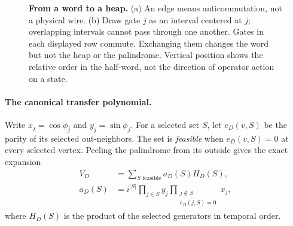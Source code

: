 \documentclass[10pt,letterpaper]{article}
\begin{document}
\begin{figure}[t]
\centering
{}
\caption{\textbf{From a word to a heap.} (a) An edge means anticommutation, not a physical wire. (b) Draw gate $j$ as an interval centered at $j$; overlapping intervals cannot pass through one another. Gates in each displayed row commute. Exchanging them changes the word but not the heap or the palindrome. Vertical position shows the relative order in the half-word, not the direction of operator action on a state.}
\label{L:heapfig}
\end{figure}

\paragraph{The canonical transfer polynomial.}
Write $x_j=\cos\phi_j$ and $y_j=\sin\phi_j$. For a selected set $S$, let $e_D(v,S)$ be the parity of its selected out-neighbors. The set is \emph{feasible} when $e_D(v,S)=0$ at every selected vertex. Peeling the palindrome from its outside gives the exact expansion
\begin{align}
 V_D&=\sum_{S\text{ feasible}}a_D(S)H_D(S),\label{L:expansion}\\
 a_D(S)&=i^{|S|}\prod_{j\in S}y_j
       \prod_{\substack{j\notin S\\e_D(j,S)=0}}x_j,\label{L:amplitude}
\end{align}
where $H_D(S)$ is the product of the selected generators in temporal order.
\end{document}
